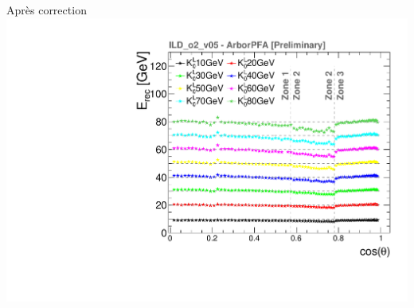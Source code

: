 \documentclass[8pt]{beamer}
\begin{document}
\begin{frame}
\begin{minipage}{0.46\linewidth}
\begin{center}
        Après correction \\ \includegraphics[width=0.75\linewidth]{ERecLinGap_nofit_thesis.pdf}
      \end{center}
    \end{minipage}
  \end{frame}
\end{document}
